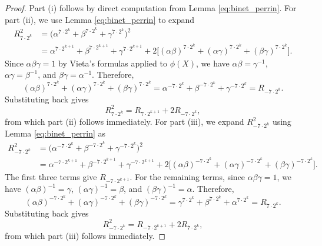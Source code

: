 \documentclass[11pt,a4paper]{article}
\numberwithin{equation}{section}
\numberwithin{table}{section}
\numberwithin{figure}{section}
\begin{document}
\begin{proof}
	Part (i) follows by direct computation from Lemma \ref{eq:binet_perrin}. For part (ii), 
	we use Lemma \ref{eq:binet_perrin} to expand
	\begin{align*}
		R_{7\cdot 2^k}^2 
		&= \big(\alpha^{7\cdot 2^k} + \beta^{7\cdot 2^k} 
		+ \gamma^{7\cdot 2^k}\big)^2\\
		&= \alpha^{7\cdot 2^{k+1}} + \beta^{7\cdot 2^{k+1}} 
		+ \gamma^{7\cdot 2^{k+1}}
		 + 2\big[(\alpha\beta)^{7\cdot 2^k} 
		+ (\alpha\gamma)^{7\cdot 2^k} 
		+ (\beta\gamma)^{7\cdot 2^k}\big].
	\end{align*}
	Since $\alpha\beta\gamma = 1$ by Vieta's formulas applied 
	to $\phi(X)$, we have 
	$\alpha\beta = \gamma^{-1}$, $\alpha\gamma = \beta^{-1}$, 
	and $\beta\gamma = \alpha^{-1}$. Therefore,
	\begin{equation*}
		(\alpha\beta)^{7\cdot 2^k} + (\alpha\gamma)^{7\cdot 2^k} 
		+ (\beta\gamma)^{7\cdot 2^k} 
		= \alpha^{-7\cdot 2^k} + \beta^{-7\cdot 2^k} 
		+ \gamma^{-7\cdot 2^k} = R_{-7\cdot 2^k}.
	\end{equation*}
	Substituting back gives
	\begin{equation*}
		R_{7\cdot 2^k}^2 = R_{7\cdot 2^{k+1}} + 2R_{-7\cdot 2^k},
	\end{equation*}
	from which part (ii) follows immediately. 
	For part (iii), we expand $R_{-7\cdot 2^k}^2$ using Lemma \ref{eq:binet_perrin} as
	\begin{align*}
		R_{-7\cdot 2^k}^2 
		&= \big(\alpha^{-7\cdot 2^k} + \beta^{-7\cdot 2^k} 
		+ \gamma^{-7\cdot 2^k}\big)^2\\
		&= \alpha^{-7\cdot 2^{k+1}} + \beta^{-7\cdot 2^{k+1}} 
		+ \gamma^{-7\cdot 2^{k+1}} + 2\big[(\alpha\beta)^{-7\cdot 2^k} 
		+ (\alpha\gamma)^{-7\cdot 2^k} 
		+ (\beta\gamma)^{-7\cdot 2^k}\big].
	\end{align*}
	The first three terms give $R_{-7\cdot 2^{k+1}}$. For the 
	remaining terms, since $\alpha\beta\gamma=1$, we have 
	$(\alpha\beta)^{-1}=\gamma$, $(\alpha\gamma)^{-1}=\beta$, 
	and $(\beta\gamma)^{-1}=\alpha$. Therefore,
	\begin{equation*}
		(\alpha\beta)^{-7\cdot 2^k} + (\alpha\gamma)^{-7\cdot 2^k} 
		+ (\beta\gamma)^{-7\cdot 2^k} 
		= \gamma^{7\cdot 2^k} + \beta^{7\cdot 2^k} 
		+ \alpha^{7\cdot 2^k} = R_{7\cdot 2^k}.
	\end{equation*}
	Substituting back gives
	\begin{equation*}
		R_{-7\cdot 2^k}^2 = R_{-7\cdot 2^{k+1}} + 2R_{7\cdot 2^k},
	\end{equation*}
	from which part (iii) follows immediately.
\end{proof}
\end{document}
